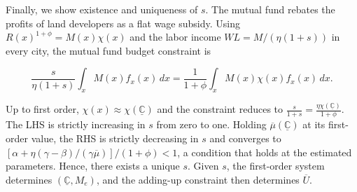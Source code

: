 Finally, we show existence and uniqueness of $s$. The mutual fund rebates the profits of land developers as a flat wage subsidy. Using $R(x)^{1+\phi} = M(x) \chi(x)$ and the labor income $W L = M/(\eta(1+s))$ in every city, the mutual fund budget constraint is

\begin{equation*}
	\frac{s}{\eta(1+s)} \int_x M(x) f_x(x)\, dx = \frac{1}{1+\phi} \int_x M(x) \chi(x) f_x(x)\, dx.
\end{equation*}

Up to first order, $\chi(x) \approx \chi(\underline{\mathbb{C}})$ and the constraint reduces to $\frac{s}{1+s} = \frac{\eta \chi(\underline{\mathbb{C}})}{1+\phi}$. The LHS is strictly increasing in $s$ from zero to one. Holding $\overline{\mu}(\underline{\mathbb{C}})$ at its first-order value, the RHS is strictly decreasing in $s$ and converges to $\left[\alpha + \eta(\gamma - \beta)/(\gamma \overline{\mu})\right]/(1+\phi) < 1$, a condition that holds at the estimated parameters. Hence, there exists a unique $s$. Given $s$, the first-order system determines $(\underline{\mathbb{C}}, M_e)$, and the adding-up constraint then determines $\overline{U}$.

